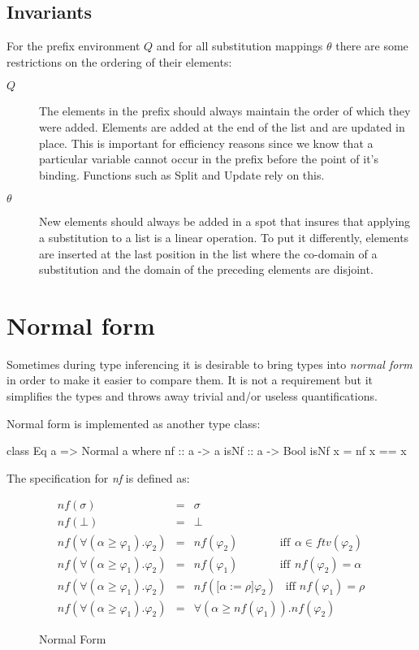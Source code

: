 \subsection{Invariants}
For the prefix environment $Q$ and for all substitution mappings $\theta$ there are some restrictions on the ordering of their elements:
\begin{description}
\item[\textbf{$Q$}] The elements in the prefix should always maintain the order of which they were added. Elements are added at the end of the list and are updated in place. This is important for efficiency reasons since we know that a particular variable cannot occur in the prefix before the point of it's binding. Functions such as Split and Update rely on this.
\item[\textbf{$\theta$}] New elements should always be added in a spot that insures that applying a substitution to a list is a linear operation. To put it differently, elements are inserted at the last position in the list where the co-domain of a substitution and the domain of the preceding elements are disjoint.
\end{description}
\section{Normal form}
Sometimes during type inferencing it is desirable to bring types into \emph{normal form} in order to make it easier to compare them. It is not a requirement but it simplifies the types and throws away trivial and/or useless quantifications.

Normal form is implemented as another type class:

\begin{code}
class Eq a => Normal a where
  nf :: a -> a
  isNf :: a -> Bool
  isNf x = nf x == x
\end{code}

The specification for \emph{nf} is defined as:

\begin{figure}[H]
\begin{eqnarray*}
nf(\sigma) & = & \sigma \\
nf(\bot) & = & \bot \\
nf(\forall(\alpha \geq \varphi_1).\varphi_2) & = & nf(\varphi_2) \hspace{40pt} \textrm{ iff} \hspace{5pt} \alpha \in ftv (\varphi_2) \\
nf(\forall(\alpha \geq \varphi_1).\varphi_2) & = & nf(\varphi_1) \hspace{40pt} \textrm{ iff} \hspace{5pt} nf (\varphi_2) = \alpha \\
nf(\forall(\alpha \geq \varphi_1).\varphi_2) & = & nf(\lbrack \alpha := \rho \rbrack\varphi_2) \hspace{10pt} \textrm{iff } nf(\varphi_1)=\rho \\
nf(\forall(\alpha \geq \varphi_1).\varphi_2) & = & \forall(\alpha \geq nf(\varphi_1)).nf(\varphi_2)
\end{eqnarray*}
\caption{Normal Form}
\end{figure}

